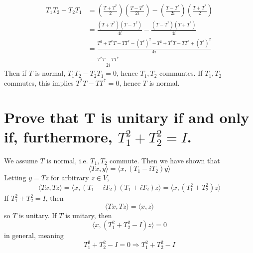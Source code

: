 \documentclass[answers]{exam}
\begin{document}
\begin{questions}
\begin{parts}
	\begin{solution}
		\begin{align*}
			T_1T_2 - T_2T_1 &= \left(\frac{T+T^*}{2}\right)\left(\frac{T-T^*}{2i}\right) - \left(\frac{T-T^*}{2i}\right)\left(\frac{T+T^*}{2}\right)  \\
					&= \frac{(T+T^*)(T-T^*)}{4i} - \frac{(T-T^*)(T+T^*)}{4i}\\
			       &= \frac{T^2+T^*T-TT^*-(T^*)^2 - T^2 + T^*T - TT^* + (T^*)^2}{4i} \\
			       &= \frac{T^*T - TT^*}{2i}
		\end{align*}
		Then if $T$ is normal, $T_1T_2-T_2T_1 = 0$, hence $T_1, T_2$ communtes. If $T_1,T_2$ commutes, this implies $T^*T-TT^* = 0$, hence $T$ is normal.
	\end{solution}

	\part{Prove that T is unitary if and only if, furthermore, $T_1^2 + T_2^2 = I$.}

	\begin{solution}
		We assume $T$ is normal, i.e. $T_1,T_2$ commute. Then we have shown that
		$$\langle Tx,y \rangle = \langle x,(T_1-iT_2)y \rangle $$
		Letting $y = Tz$ for arbitrary $z \in V$,
		$$\langle Tx,Tz \rangle = \langle x,(T_1-iT_2)(T_1+iT_2)z \rangle = \langle x,(T_1^2+T_2^2)z \rangle$$
		If $T_1^2+T_2^2 = I$, then
		$$\langle Tx,Tz \rangle = \langle x,z \rangle$$
		so $T$ is unitary. If $T$ is unitary, then
		$$\langle x,(T_1^2+T_2^2-I)z \rangle = 0$$
		in general, meaning
		$$T_1^2+T_2^2-I = 0 \Rightarrow T_1^2+T_2^2 - I$$
	\end{solution}

\end{parts}



\end{questions}
\end{document}
